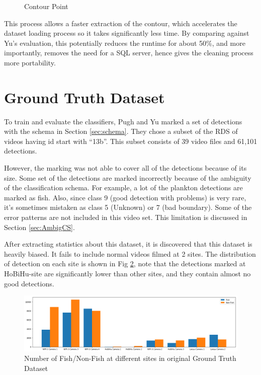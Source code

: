 \documentclass[bsc,logo,twoside,fullspacing,parskip]{infthesis}
\begin{document}
\begin{figure}[!ht]
\begin{minipage}[t]{0.3 \linewidth}
		\caption{\footnotesize Contour Point}
		\label{fig:bbcc3}
	\end{minipage}
\end{figure}

\vspace{-20pt}

This process allows a faster extraction of the contour, which accelerates the dataset loading process so it takes significantly less time. 
By comparing against Yu's\cite{Yu} evaluation, this potentially reduces the runtime for about 50\%, and more importantly, removes the need for a SQL server, hence gives the cleaning process more portability.


\vspace{-10pt}

\section{Ground Truth Dataset}
\label{sec:gt}

\vspace{-10pt}

To train and evaluate the classifiers, Pugh and Yu marked a set of detections with the schema in Section \ref{sec:schema}. 
They chose a subset of the RDS of videos having id start with ``13b''. This subset consists of 39 video files and 61,101 detections. 

However, the marking was not able to cover all of the detections because of its size. 
Some set of the detections are marked incorrectly because of the ambiguity of the classification schema. 
For example, a lot of the plankton detections are marked as fish. 
Also, since class 9 (good detection with problems) is very rare, it's sometimes mistaken as class 5 (Unknown) or 7 (bad boundary). Some of the error patterns are not included in this video set. This limitation is discussed in Section \ref{sec:AmbigCS}.

After extracting statistics about this dataset, it is discovered that this dataset is heavily biased. 
It fails to include normal videos filmed at 2 sites. The distribution of detection on each site is shown in Fig \ref{fig:gtdist}, note that the detections marked at HoBiHu-site are significantly lower than other sites, and they contain almost no good detections.

\vspace{-5pt}

\begin{figure}[h]
    \centering
    \includegraphics[scale=0.34]{graph/classdist.png}
    \caption{Number of Fish/Non-Fish at different sites in original Ground Truth Dataset}
    \label{fig:gtdist}
\end{figure}
\end{document}
